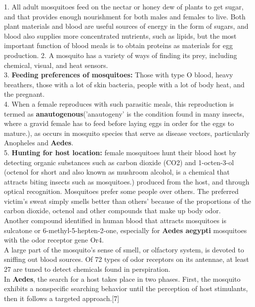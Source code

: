 \documentclass[11pt]{exam}
\begin{document}
\begin{questions}
1. All adult mosquitoes feed on the nectar or honey dew of plants to get sugar, and that provides enough nourishment for both males and females to live. %
Both plant materials and blood are useful sources of energy in the form of sugars, and blood also supplies more concentrated nutrients, such as lipids, but the most important function of blood meals is to obtain proteins as materials for egg production.
2. A mosquito has a variety of ways of finding its prey, including chemical, visual, and heat sensors. \\
3. \textbf{Feeding preferences of mosquitoes:} Those with type O blood, heavy breathers, those with a lot of skin bacteria, people with a lot of body heat, and the pregnant.\\
4. When a female reproduces with such parasitic meals, this reproduction is termed as \textbf{anautogenous}('anautogeny' is the condition found in many insects, where a gravid female has to feed before laying eggs in order for the eggs to mature.), as occurs in mosquito species that serve as disease vectors, particularly Anopheles and \textbf{Aedes}.\\
5. \textbf{Hunting for host location:} female mosquitoes hunt their blood host by detecting organic substances such as carbon dioxide (CO2) and 1-octen-3-ol (octenol for short and also known as mushroom alcohol, is a chemical that attracts biting insects such as mosquitoes.) produced from the host, and through optical recognition. Mosquitoes prefer some people over others. The preferred victim's sweat simply smells better than others' because of the proportions of the carbon dioxide, octenol and other compounds that make up body odor. \\
Another compound identified in human blood that attracts mosquitoes is sulcatone or 6-methyl-5-hepten-2-one, especially for \textbf{Aedes aegypti} mosquitoes with the odor receptor gene Or4. \\
A large part of the mosquito’s sense of smell, or olfactory system, is devoted to sniffing out blood sources. Of 72 types of odor receptors on its antennae, at least 27 are tuned to detect chemicals found in perspiration. \\
In \textbf{Aedes}, the search for a host takes place in two phases. First, the mosquito exhibits a nonspecific searching behavior until the perception of host stimulants, then it follows a targeted approach.[7] \\

\end{questions}
\end{document}
